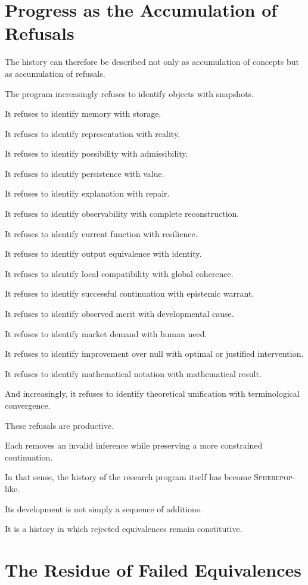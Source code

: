 \documentclass[11pt]{article}
\theoremstyle{remark}
\newcommand{\Spherepop}{\textsc{Spherepop}}
\begin{document}
\section{Progress as the Accumulation of Refusals}

The history can therefore be described not only as accumulation of concepts but as accumulation of refusals.

The program increasingly refuses to identify objects with snapshots.

It refuses to identify memory with storage.

It refuses to identify representation with reality.

It refuses to identify possibility with admissibility.

It refuses to identify persistence with value.

It refuses to identify explanation with repair.

It refuses to identify observability with complete reconstruction.

It refuses to identify current function with resilience.

It refuses to identify output equivalence with identity.

It refuses to identify local compatibility with global coherence.

It refuses to identify successful continuation with epistemic warrant.

It refuses to identify observed merit with developmental cause.

It refuses to identify market demand with human need.

It refuses to identify improvement over null with optimal or justified intervention.

It refuses to identify mathematical notation with mathematical result.

And increasingly, it refuses to identify theoretical unification with terminological convergence.

These refusals are productive.

Each removes an invalid inference while preserving a more constrained continuation.

In that sense, the history of the research program itself has become \Spherepop-like.

Its development is not simply a sequence of additions.

It is a history in which rejected equivalences remain constitutive.

\section{The Residue of Failed Equivalences}
\end{document}

